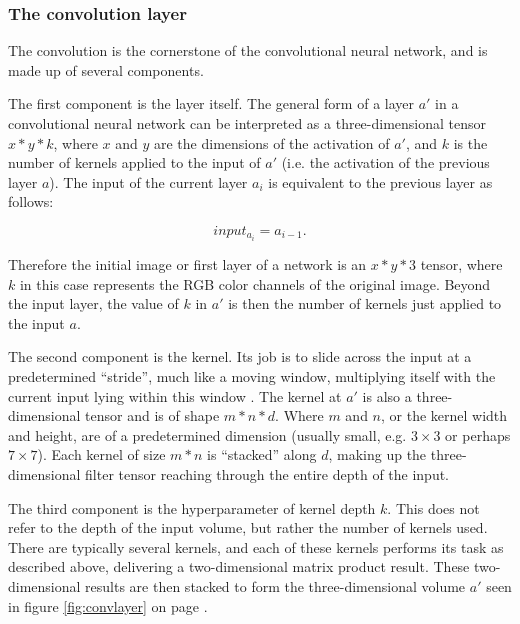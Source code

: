 \subsubsection{The convolution layer}
The convolution is the cornerstone of the convolutional neural network, and is made up of several components.

The first component is the layer itself. The general form of a layer $a'$ in a convolutional neural network can be interpreted as a three-dimensional tensor $x*y*k$, where $x$ and $y$ are the dimensions of the activation of $a'$, and $k$ is the number of kernels applied to the input of $a'$ (i.e. the activation of the previous layer $a$). The input of the current layer $a_{i}$ is equivalent to the previous layer as follows:

\begin{equation}
\label{eqn:forward}
input_{a_{i}} = a_{i-1}.
\end{equation}

Therefore the initial image or first layer of a network is an $x*y*3$ tensor, where $k$ in this case represents the RGB color channels of the original image. Beyond the input layer, the value of $k$ in $a'$ is then the number of kernels just applied to the input $a$.

The second component is the kernel. Its job is to slide across the input at a predetermined ``stride'', much like a moving window, multiplying itself with the current input lying within this window \cite{convnets}. The kernel at $a'$ is also a three-dimensional tensor and is of shape $m*n*d$. Where $m$ and $n$, or the kernel width and height, are of a predetermined dimension (usually small, e.g. $3\times3$ or perhaps $7\times7$). Each kernel of size $m*n$ is ``stacked'' along $d$, making up the three-dimensional filter tensor reaching through the entire depth of the input.

The third component is the hyperparameter of kernel depth $k$. This does not refer to the depth of the input volume, but rather the number of kernels used. There are typically several kernels, and each of these kernels performs its task as described above, delivering a two-dimensional matrix product result. These two-dimensional results are then stacked to form the three-dimensional volume $a'$ seen in figure \ref{fig:convlayer} on page \pageref{fig:convlayer}.


